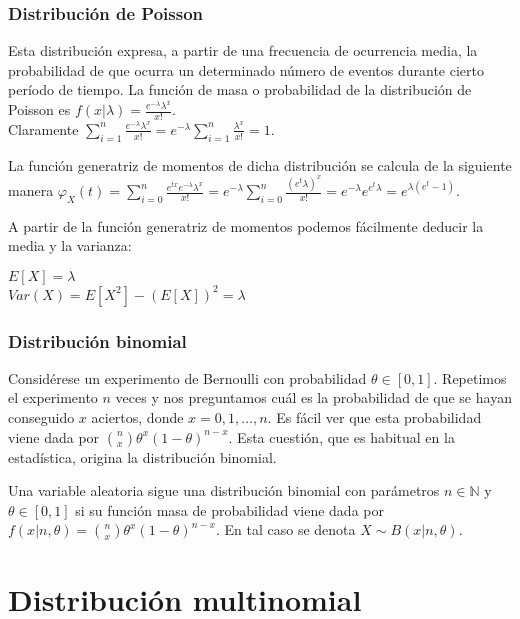 \documentclass{article}
\begin{document}
\subsubsection{Distribución de Poisson}
Esta distribución expresa, a partir de una frecuencia de ocurrencia media, la probabilidad de que ocurra un determinado número de eventos durante cierto período de tiempo. La función de masa o probabilidad de la distribución de Poisson es $f(x| \lambda) = \frac{e^{-\lambda}{\lambda}^x}{x!}$. \\Claramente $\sum^n_{i=1}  \frac{e^{-\lambda}{\lambda}^x}{x!} = e^{-\lambda} \sum^n_{i=1}  \frac{{\lambda}^x}{x!}  = 1$.


La función generatriz de momentos de dicha distribución se calcula de la siguiente manera $\varphi_X(t) = \sum^n_{i=0} \frac{e^{tx}e^{-\lambda}{\lambda}^x}{x!} = e^{-\lambda} \sum^n_{i=0}   \frac{(e^{t}  \lambda)^x}{x!} =  e^{-\lambda}  e ^{e^{t} \lambda} = e ^{\lambda (e^t -1 )}$.

A partir de la función generatriz de momentos podemos fácilmente deducir la media y la varianza:
\begin{center}
	$E[X] = \lambda $
	\\$Var(X) =  E[X^2] - (E[X])^2 =  \lambda$
\end{center}

\subsubsection{Distribución binomial}

Considérese un experimento de Bernoulli con probabilidad $\theta \in [0,1]$. Repetimos el experimento $n$ veces y nos preguntamos cuál es la probabilidad de que se hayan conseguido $x$ aciertos, donde $x = 0, 1, \ldots, n$. Es fácil ver que esta probabilidad viene dada por $\binom{n}{x} \theta^x (1-\theta)^{n-x}$. Esta cuestión, que es habitual en la estadística, origina la distribución binomial.

\begin{definition}
    Una variable aleatoria sigue una distribución binomial con parámetros $n \in \mathbb{N}$ y $\theta \in [0,1]$  si su función masa de probabilidad viene dada por $f(x|n,\theta) = \binom{n}{x} \theta^x (1-\theta)^{n-x}$. En tal caso se denota $X \sim B(x|n,\theta)$.
\end{definition}

\section{Distribución multinomial}
\end{document}
